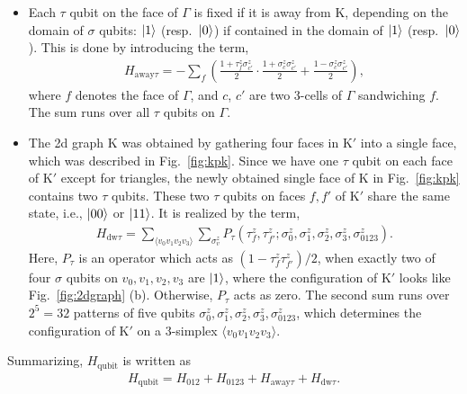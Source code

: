 \documentclass[12pt]{article}
\numberwithin{equation}{section}
\begin{document}
\begin{itemize}
    \item Each $\tau$ qubit on the face of $\Gamma$ is fixed if it is away from $\mathrm{K}$, depending on the domain of $\sigma$ qubits: $\ket{1}$ (resp.~$\ket{0}$) if contained in the domain of $\ket{1}$ (resp.~$\ket{0}$).
    This is done by introducing the term,
    \begin{align}
        H_{\mathrm{away}\tau}=-\sum_f\left(\frac{1+\tau_f^z\sigma_{c'}^z}{2}\cdot \frac{1+\sigma_c^z\sigma_{c'}^z}{2}+\frac{1-\sigma_c^z\sigma_{c'}^z}{2}\right),
    \end{align}
    where $f$ denotes the face of $\Gamma$, and $c$, $c'$ are two 3-cells of $\Gamma$ sandwiching $f$. The sum runs over all $\tau$ qubits on $\Gamma$.
    
    \item The 2d graph $\mathrm{K}$ was obtained by gathering four faces in $\mathrm{K}'$ into a single face, which was described in Fig.~\ref{fig:kpk}. 
    Since we have one $\tau$ qubit on each face of $\mathrm{K}'$ except for triangles, the newly obtained single face of $\mathrm{K}$ in Fig.~\ref{fig:kpk} contains two $\tau$ qubits.
    These two $\tau$ qubits on faces $f, f'$ of $\mathrm{K}'$ share the same state, i.e., $\ket{00}$ or $\ket{11}$. It is realized by the term,
    \begin{align}
        H_{\mathrm{dw}\tau}=\sum_{\langle v_0v_1v_2v_3\rangle}\sum_{\sigma_v^z}P_{\tau}(\tau^z_f, \tau^z_{f'}; \sigma_0^z, \sigma_1^z, \sigma_2^z, \sigma_3^z, \sigma_{0123}^z).
    \end{align}
    Here, $P_{\tau}$ is an operator which acts as $(1-\tau_f^z\tau_{f'}^z)/2$, when exactly two of four $\sigma$ qubits on $v_0,v_1,v_2,v_3$ are $\ket{1}$, where the configuration of  $\mathrm{K}'$ looks like Fig.~\ref{fig:2dgraph} (b). 
    Otherwise, $P_{\tau}$ acts as zero. The second sum runs over $2^5=32$ patterns of five qubits $\sigma_0^z, \sigma_1^z, \sigma_2^z, \sigma_3^z, \sigma_{0123}^z$, which determines the configuration of $\mathrm{K}'$ on a 3-simplex $\langle v_0v_1v_2v_3\rangle$.
\end{itemize}

Summarizing, $H_{\mathrm{qubit}}$ is written as
\begin{align}
    H_{\mathrm{qubit}}=H_{012}+H_{0123}+H_{\mathrm{away}\tau}+H_{\mathrm{dw}\tau}.
\end{align}
\end{document}
